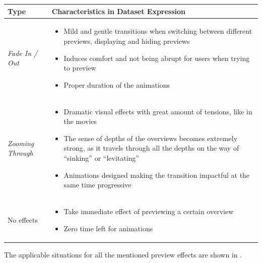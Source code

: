 \begingroup
\centering
\begin{tabu} to .97\textwidth { | X[1, r, m] | X[3, l, m] | }
    \hline
    Type & Characteristics in Dataset Expression \\
    \hline\hline
    \emph{Fade In / Out} &
    \vspace{.85em}\begin{itemize}
        \item Mild and gentle transitions when switching between different previews, displaying and hiding previews
        \item Induces comfort and not being abrupt for users when trying to preview
        \item Proper duration of the animations
    \end{itemize} \\
    \hline
    \emph{Zooming Through} &
    \vspace{.85em}\begin{itemize}
        \item Dramatic visual effects with great amount of tensions, like in the movies
        \item The sense of depths of the overviews becomes extremely strong, as it travels through all the depths on the way of ``sinking'' or ``levitating''
        \item Animations designed making the transition impactful at the same time progressive
    \end{itemize} \\
    \hline
    No effects &
    \vspace{.85em}\begin{itemize}
        \item Take immediate effect of previewing a certain overview
        \item Zero time left for animations
    \end{itemize} \\
    \hline
\end{tabu}
\label{tbl:preview:exp}
\endgroup

The applicable situations for all the mentioned preview effects are shown in .


